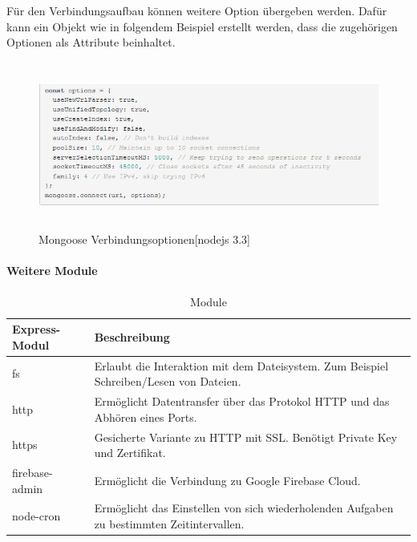 Für den Verbindungsaufbau können weitere Option übergeben werden. Dafür kann ein Objekt wie in folgendem Beispiel erstellt werden, dass die zugehörigen Optionen als Attribute beinhaltet. 
\newline


\begin{figure}[h]
\centering
\includegraphics[height=5.5cm]{images/nodeJS_mongooseVerbindungOptions.PNG}
\caption{Mongoose Verbindungsoptionen[nodejs 3.3] }
\end{figure}

\newpage
\paragraph{Weitere Module}

\begin{table}[h]
\begin{center}
    \begin{tabular}{| l | p{8cm} |}
    \hline
    Express-Modul & Beschreibung \\ \hline
    fs & Erlaubt die Interaktion mit dem Dateisystem.\newline
	Zum Beispiel Schreiben/Lesen von Dateien.\\
    
    \hline
    http & Ermöglicht Datentransfer über das Protokol HTTP und das Abhören eines Ports.  \\
    
    \hline
	https & Gesicherte Variante zu HTTP mit SSL.\newline
	Benötigt Private Key und Zertifikat.  \\
	
    \hline    
    firebase-admin & Ermöglicht die Verbindung zu Google Firebase 			Cloud. \\ 
    
    \hline    
    node-cron & Ermöglicht das Einstellen von sich wiederholenden 			Aufgaben zu bestimmten Zeitintervallen.  \\
    \hline
    \end{tabular}
\end{center}
\caption{Module}
\end{table}
